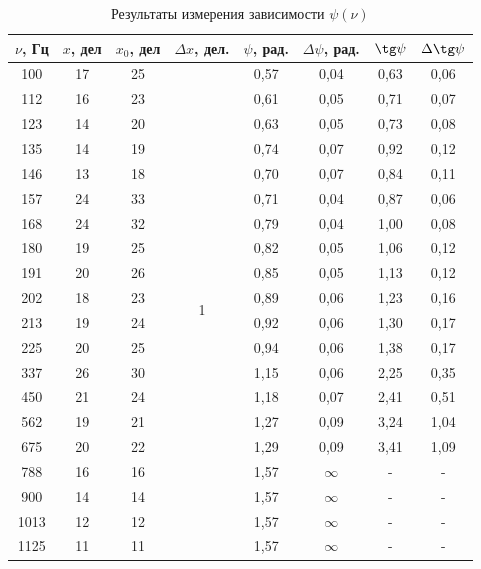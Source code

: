 \documentclass[a4paper, 12pt]{article}
\begin{document}
     \begin{table}[H]
        \centering
        \begin{tabular}{|c|c|c|c|c|c|c|c|}
        \hline
        $\nu$, Гц & $x$, дел & $x_0$, дел & $\Delta x$, дел. & $\psi$, рад. & $\Delta \psi$, рад. & $\tg \psi$ & $\Delta \tg \psi$ \\ \hline
        100 & 17 & 25 & \multirow{20}{*}{1} & 0,57 & 0,04 & 0,63 & 0,06 \\ \cline{1-3} \cline{5-8} 
        112 & 16 & 23 &  & 0,61 & 0,05 & 0,71 & 0,07 \\ \cline{1-3} \cline{5-8} 
        123 & 14 & 20 &  & 0,63 & 0,05 & 0,73 & 0,08 \\ \cline{1-3} \cline{5-8} 
        135 & 14 & 19 &  & 0,74 & 0,07 & 0,92 & 0,12 \\ \cline{1-3} \cline{5-8} 
        146 & 13 & 18 &  & 0,70 & 0,07 & 0,84 & 0,11 \\ \cline{1-3} \cline{5-8} 
        157 & 24 & 33 &  & 0,71 & 0,04 & 0,87 & 0,06 \\ \cline{1-3} \cline{5-8} 
        168 & 24 & 32 &  & 0,79 & 0,04 & 1,00 & 0,08 \\ \cline{1-3} \cline{5-8} 
        180 & 19 & 25 &  & 0,82 & 0,05 & 1,06 & 0,12 \\ \cline{1-3} \cline{5-8} 
        191 & 20 & 26 &  & 0,85 & 0,05 & 1,13 & 0,12 \\ \cline{1-3} \cline{5-8} 
        202 & 18 & 23 &  & 0,89 & 0,06 & 1,23 & 0,16 \\ \cline{1-3} \cline{5-8} 
        213 & 19 & 24 &  & 0,92 & 0,06 & 1,30 & 0,17 \\ \cline{1-3} \cline{5-8} 
        225 & 20 & 25 &  & 0,94 & 0,06 & 1,38 & 0,17 \\ \cline{1-3} \cline{5-8} 
        337 & 26 & 30 &  & 1,15 & 0,06 & 2,25 & 0,35 \\ \cline{1-3} \cline{5-8} 
        450 & 21 & 24 &  & 1,18 & 0,07 & 2,41 & 0,51 \\ \cline{1-3} \cline{5-8} 
        562 & 19 & 21 &  & 1,27 & 0,09 & 3,24 & 1,04 \\ \cline{1-3} \cline{5-8} 
        675 & 20 & 22 &  & 1,29 & 0,09 & 3,41 & 1,09 \\ \cline{1-3} \cline{5-8} 
        788 & 16 & 16 &  & 1,57 & $\infty$ & - & - \\ \cline{1-3} \cline{5-8} 
        900 & 14 & 14 &  & 1,57 & $\infty$ & - & - \\ \cline{1-3} \cline{5-8} 
        1013 & 12 & 12 & & 1,57 & $\infty$ & - & - \\ \cline{1-3} \cline{5-8} 
        1125 & 11 & 11 & & 1,57 & $\infty$ & - & - \\ \hline
        \end{tabular}
        \caption{Результаты измерения зависимости $\psi (\nu)$}
        \label{table:phase_ll}
    \end{table}
\end{document}
